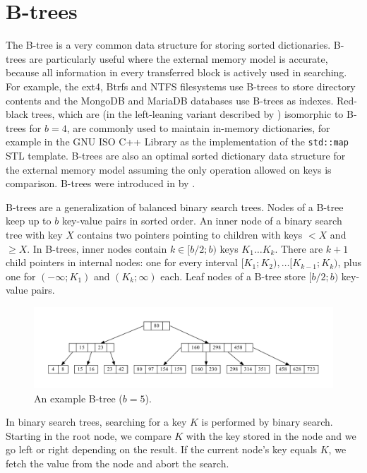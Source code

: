 \chapter{B-trees}
\label{chapter:btree}
The B-tree is a very common data structure for storing sorted dictionaries.
B-trees are particularly useful where the external memory model is accurate,
because all information in every transferred block is actively used
in searching. For example, the ext4, Btrfs and NTFS filesystems use B-trees
to store directory contents and the MongoDB and MariaDB databases use B-trees
as indexes. Red-black trees, which are (in the left-leaning variant
described by \cite{left-leaning}) isomorphic to B-trees for $b=4$, are
commonly used to maintain in-memory dictionaries, for example in the GNU ISO
C++ Library as the implementation of the \texttt{std::map} STL template.
B-trees are also an optimal sorted dictionary data structure
for the external memory model assuming the only operation allowed on
keys is comparison.
B-trees were introduced in \citeyear{btree} by \citeauthor{btree}.

B-trees are a generalization of balanced binary search trees.
Nodes of a B-tree keep up to $b$ key-value pairs in sorted order.
An inner node of a binary search tree with key $X$ contains two pointers
pointing to children with keys $< X$ and $\geq X$. In B-trees,
inner nodes contain $k\in[b/2;b)$ keys $K_1\ldots K_k$. There are $k+1$
child pointers in internal nodes: one for every interval
$[K_1;K_2),\ldots [K_{k-1};K_k)$, plus one for $(-\infty;K_1)$ and
$(K_k;\infty)$ each.
Leaf nodes of a B-tree store $[b/2;b)$ key-value pairs.

\begin{figure}
\centering
\includegraphics[width=\linewidth]{img/btree}
\caption{An example B-tree ($b=5$).}
\end{figure}

In binary search trees, searching for a key $K$ is performed by binary search.
Starting in the root node, we compare $K$ with the key stored in the node
and we go left or right depending on the result. If the current node's key
equals $K$, we fetch the value from the node and abort the search.


